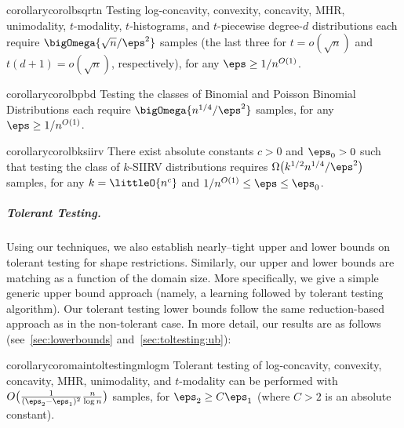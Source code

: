 \begin{restatable}{corollary}{corolbsqrtn}\label{coro:lb:sqrtn}
  Testing log-concavity, convexity, concavity, MHR, unimodality, $t$-modality, $t$-histograms, and $t$-piecewise degree-$d$ distributions each require $\bigOmega{{\sqrt{n}}/{\eps^2}}$ samples (the last three for $t = o(\sqrt{n})$ and $t(d+1) = o(\sqrt{n})$, respectively), for any $\eps\geq 1/n^{O(1)}$.
\end{restatable}

\begin{restatable}{corollary}{corolbpbd}\label{coro:lb:pbd}
  Testing the classes of Binomial and Poisson Binomial Distributions each require $\bigOmega{{n^{1/4}}/{\eps^2}}$ samples, for any $\eps\geq 1/n^{O(1)}$.
\end{restatable}

\begin{restatable}{corollary}{corolbksiirv}\label{coro:lb:ksiirv}
  There exist absolute constants $c>0$ and $\eps_0 > 0$ such that testing the class of $k$-SIIRV distributions requires $\Omega\big( k^{1/2}n^{1/4}/\eps^2 \big)$ samples, for any $k=\littleO{n^c}$ and ${1}/{n^{O(1)}} \leq \eps \leq \eps_0$.
\end{restatable}

\subparagraph{Tolerant Testing.} 
Using our techniques, we also establish nearly--tight upper and lower bounds on tolerant testing for shape restrictions. 
Similarly, our upper and lower bounds are matching as a function of the domain size.
More specifically, we give a simple generic upper bound approach (namely, a learning followed by tolerant testing algorithm).
Our tolerant testing lower bounds follow the same reduction-based approach as in the non-tolerant case. 
In more detail, our results are as follows (see~\cref{sec:lowerbounds} and~\cref{sec:toltesting:ub}):

\begin{restatable}{corollary}{coromaintoltestingmlogm}\label{coro:main:tol:testing:mlogm}
Tolerant testing of log-concavity, convexity, concavity, MHR, unimodality, and $t$-modality can be performed with $O\big( \frac{1}{(\eps_2-\eps_1)^2}\frac{n}{\log n} \big)$ samples, for $\eps_2 \geq C \eps_1$ (where $C>2$ is an absolute constant).
\end{restatable}

